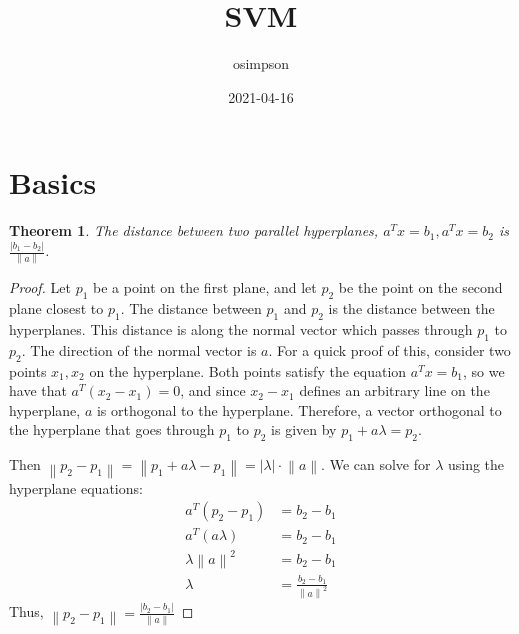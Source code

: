 \documentclass[12pt]{article}
\title{SVM}
\author{osimpson}
\date{2021-04-16}
\newtheorem{theorem}{Theorem}
\newcommand{\norm}[1]{\left\lVert#1\right\rVert}
\begin{document}
\maketitle

\section{Basics}

\begin{theorem}
    The distance between two parallel hyperplanes, $a^Tx=b_1, a^Tx=b_2$ is 
    $\frac{|b_1-b_2|}{\norm{a}}$.
\end{theorem}

\begin{proof}
    Let $p_1$ be a point on the first plane, and let $p_2$ be the point on the
    second plane closest to $p_1$.  The distance between $p_1$ and $p_2$ is the
    distance between the hyperplanes.  This distance is along the normal vector
    which passes through $p_1$ to $p_2$.  The direction of the normal vector is
    $a$.  For a quick proof of this, consider two points $x_1, x_2$ on the 
    hyperplane.  Both points satisfy the equation $a^Tx=b_1$, so we have that 
    $a^T(x_2-x_1)=0$, and since $x_2-x_1$ defines an arbitrary line on the
    hyperplane, $a$ is orthogonal to the hyperplane.  Therefore, a vector orthogonal
    to the hyperplane that goes through $p_1$ to $p_2$ is given by $p_1+a\lambda=p_2$.

    Then $\norm{p_2-p_1} = \norm{p_1+a\lambda - p_1} = |\lambda| \cdot \norm{a}$.
    We can solve for $\lambda$ using the hyperplane equations:
    \begin{equation}
        \begin{split}
            a^T(p_2-p_1) &= b_2-b_1 \\
            a^T(a\lambda) &= b_2-b_1 \\
            \lambda\norm{a}^2 &= b_2-b_1 \\
            \lambda &= \frac{b_2 - b_1}{\norm{a}^2}
        \end{split}
    \end{equation}
    Thus, $\norm{p_2 - p_1} = \frac{|b_2-b_1|}{\norm{a}}$

\end{proof}
\end{document}

